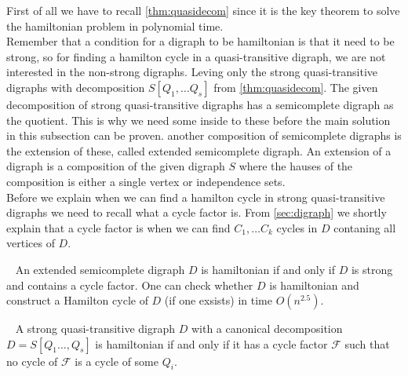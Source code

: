 First of all we have to recall \autoref{thm:quasidecom} since it is the key theorem to solve the hamiltonian problem in polynomial time. \\
Remember that a condition for a digraph to be hamiltonian is that it need to be strong, so for finding a hamilton cycle in a quasi-transitive digraph, we are not interested in the non-strong digraphs. 
Leving only the strong quasi-transitive digraphs with decomposition $S[Q_1,\dots Q_s]$ from \autoref{thm:quasidecom}. 
The given decomposition of strong quasi-transitive digraphs has a semicomplete digraph as the quotient. This is why we need some inside to these before the main solution in this subsection can be proven. another composition of semicomplete digraphs is the extension of these, called extended semicomplete digraph. An extension of a digraph is a composition of the given digraph $S$ where the hauses of the composition is either a single vertex or independence sets. \\
Before we explain when we can find a hamilton cycle in strong quasi-transitive digraphs we need to recall what a cycle factor is. 
From \autoref{sec:digraph} we shortly explain that a cycle factor is when we can find $C_1,\dots C_k$ cycles in $D$ contaning all vertices of $D$. 
\begin{thm}~\cite{gutinMNN2}
    An extended semicomplete digraph $D$ is hamiltonian if and only if $D$ is strong and contains a cycle factor. One can check whether $D$ is hamiltonian and construct a Hamilton cycle of $D$ (if one exsists) in time $O(n^{2.5})$.
    \label{thm:extended}
\end{thm}
\begin{thm}~\cite{bangJGT20}
    A strong quasi-transitive digraph $D$ with a canonical decomposition \\$D=S[Q_1\dots, Q_s]$ is hamiltonian if and only if it has a cycle factor $\mathcal{F}$ such that no cycle of $\mathcal{F}$ is a cycle of some $Q_i$.
    \label{thm:qhcycle}
\end{thm}
